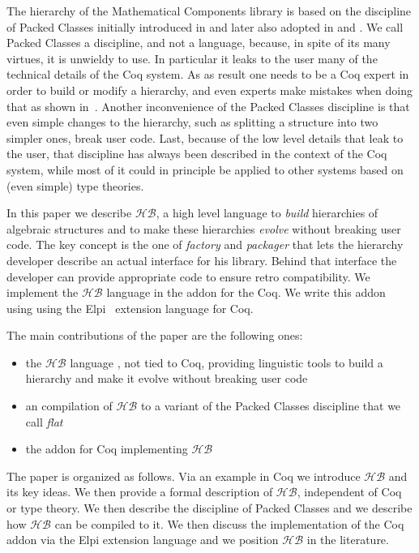 \documentclass[a4paper,UKenglish,cleveref, autoref]{lipics-v2019}
\newcommand{\HB}{\ensuremath{\mathcal{HB}}}
\newcommand{\hb}{\coq{hierarchy-builder}}
\newcommand{\factory}{factory}
\newcommand{\packager}{packager}
\theoremstyle{implem}
\theoremstyle{implem}
\theoremstyle{axiom}
\theoremstyle{abscommand}
\theoremstyle{command}
\newcommand{\boldclaim}[1]{#1}
\begin{document}
The hierarchy of the Mathematical Components library
is based on the discipline of Packed Classes initially introduced
in \cite{DBLP:conf/itp/GonthierAABCGRMOBPRSTT13} and later also adopted in
\cite{DBLP:conf/mpc/AffeldtNS19} and \cite{DBLP:journals/mics/BoldoLM15}.
We call Packed Classes a discipline, and not a language, because, in spite of
its many virtues, it is unwieldy to use. In particular it leaks to the user
many of the technical details of the Coq system. As as result one
needs to be a Coq expert in order to build or modify a hierarchy, and even
experts make mistakes when doing that as shown in~\cite{KSdraft}.
Another inconvenience of the Packed Classes discipline is that even
simple changes to the hierarchy, such as splitting a structure into
two simpler ones, break user code. \boldclaim{Last, because of the low level details
that leak to the user, that discipline has always been described in the context
of the Coq system, while most of it could in principle be applied to other
systems based on (even simple) type theories.}

In this paper we describe \HB{}, a high level language
to \emph{build} hierarchies of algebraic structures and to make these hierarchies
\emph{evolve} without breaking user code. The key concept is the one of
\emph{\factory{}} and \emph{\packager{}} that lets the hierarchy developer describe an actual
interface for his library. Behind that interface the developer can provide
appropriate code to ensure retro compatibility.
We implement the \HB{} language in the \hb{} addon for the Coq.
We write this addon using using the Elpi~\cite{DBLP:conf/lpar/DunchevGCT15,CoqElpi}
extension language for Coq.

The main contributions of the paper are the following ones:
\begin{itemize}
\item the \HB{} language \boldclaim{, not tied to Coq,} providing linguistic tools to
build a hierarchy and make it evolve without breaking user code
\item an compilation of \HB{} to a variant of the Packed Classes discipline
that we call \emph{flat}
\item the \hb{} addon for Coq implementing \HB{}
\end{itemize}

The paper is organized as follows. Via an example in Coq we introduce
\HB{} and its key ideas. We then provide a formal description of
\HB{}\boldclaim{, independent of Coq or type theory}. We then describe the discipline
of Packed Classes and we describe how \HB{} can be compiled to it.
We then discuss the implementation of the Coq addon via the Elpi extension
language and we position \HB{} in the literature.
\end{document}
